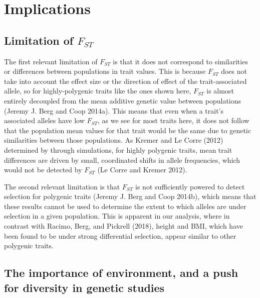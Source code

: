 \documentclass[
]{book}
\begin{document}
\hypertarget{implications}{%
\section{Implications}\label{implications}}

\hypertarget{limitation-of-f_st}{%
\subsection{\texorpdfstring{Limitation of \(F_{ST}\)}{Limitation of F\_\{ST\}}}\label{limitation-of-f_st}}

The first relevant limitation of \(F_{ST}\) is that it does not correspond to similarities or differences between populations in trait values. This is because \(F_{ST}\) does not take into account the effect size or the direction of effect of the trait-associated allele, so for highly-polygenic traits like the ones shown here, \(F_{ST}\) is almost entirely decoupled from the mean additive genetic value between populations (Jeremy J. Berg and Coop 2014a). This means that even when a trait's associated alleles have low \(F_{ST}\), as we see for most traits here, it does not follow that the population mean values for that trait would be the same due to genetic similarities between those populations. As Kremer and Le Corre (2012) determined by through simulations, for highly polygenic traits, mean trait differences are driven by small, coordinated shifts in allele frequencies, which would not be detected by \(F_{ST}\) (Le Corre and Kremer 2012).

The second relevant limitation is that \(F_{ST}\) is not sufficiently powered to detect selection for polygenic traits (Jeremy J. Berg and Coop 2014b), which means that these results cannot be used to determine the extent to which alleles are under selection in a given population. This is apparent in our analysis, where in contrast with Racimo, Berg, and Pickrell (2018), height and BMI, which have been found to be under strong differential selection, appear similar to other polygenic traits.

\hypertarget{the-importance-of-environment-and-a-push-for-diversity-in-genetic-studies}{%
\subsection{The importance of environment, and a push for diversity in genetic studies}\label{the-importance-of-environment-and-a-push-for-diversity-in-genetic-studies}}
\end{document}
